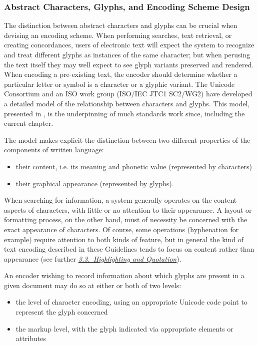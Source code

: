 \subsubsection[{Abstract Characters, Glyphs, and Encoding Scheme Design}]{Abstract Characters, Glyphs, and Encoding Scheme Design}\label{D4-43}\par
The distinction between abstract characters and glyphs can be crucial when devising an encoding scheme. When performing searches, text retrieval, or creating concordances, users of electronic text will expect the system to recognize and treat different glyphs as instances of the same character; but when perusing the text itself they may well expect to see glyph variants preserved and rendered. When encoding a pre-existing text, the encoder should determine whether a particular letter or symbol is a character or a glyphic variant. The Unicode Consortium and an ISO work group (ISO/IEC JTC1 SC2/WG2) have developed a detailed model of the relationship between characters and glyphs. This model, presented in , is the underpinning of much standards work since, including the current chapter.\par
The model makes explicit the distinction between two different properties of the components of written language: \begin{itemize}
\item their content, i.e. its meaning and phonetic value (represented by characters)
\item their graphical appearance (represented by glyphs).
\end{itemize} \par
When searching for information, a system generally operates on the content aspects of characters, with little or no attention to their appearance. A layout or formatting process, on the other hand, must of necessity be concerned with the exact appearance of characters. Of course, some operations (hyphenation for example) require attention to both kinds of feature, but in general the kind of text encoding described in these Guidelines tends to focus on content rather than appearance (see further \textit{\hyperref[COHQ]{3.3.\ Highlighting and Quotation}}).\par
An encoder wishing to record information about which glyphs are present in a given document may do so at either or both of two levels: \begin{itemize}
\item the level of character encoding, using an appropriate Unicode code point to represent the glyph concerned 
\item the markup level, with the glyph indicated via appropriate elements or attributes
\end{itemize} \par
